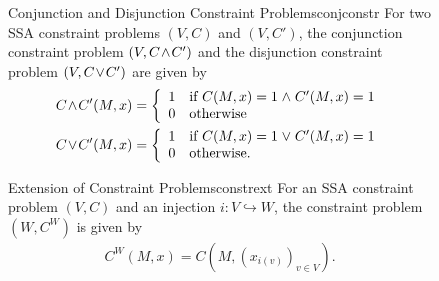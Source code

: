 \begin{figure}[p]
    \begin{definition}{Conjunction and Disjunction Constraint Problems}{conjconstr}
        For two SSA constraint problems $(V,C)$ and $(V,C')$, the
        conjunction constraint problem
        $(V,C\hspace{-0.5mm}\land\hspace{-0.5mm}C')$ and the disjunction
        constraint problem $(V,C\hspace{-0.5mm}\lor\hspace{-0.5mm}C')$ are given
        by
        \begin{align*}
            &C\hspace{-0.5mm}\land\hspace{-0.5mm}C'(M,x)=\left\{
                \begin{array}{l}
                    1\text{\quad if }C(M,x)=1\mathrel\land C'(M,x)=1\\
                    0\text{\quad otherwise}
                \end{array}\right.\\
            &C\hspace{-0.5mm}\lor\hspace{-0.5mm}C'(M,x)=\left\{
                \begin{array}{l}
                    1\text{\quad if }C(M,x)=1\mathrel\lor C'(M,x)=1\\
                    0\text{\quad otherwise}.
                \end{array}\right.
        \end{align*}
    \end{definition}

    \begin{definition}{Extension of Constraint Problems}{constrext}
        For an SSA constraint problem $(V,C)$ and an injection
        $i:V\hookrightarrow W$, the constraint problem $(W,C^W)$ is given by
        \begin{align*}
            C^W(M,x)=C\left(M,\left(x_{i(v)}\right)_{v\in V}\right).
        \end{align*}
    \end{definition}
\end{figure}

\begin{figure}[p]
    
\end{figure}

\begin{figure}[p]
    
\end{figure}

